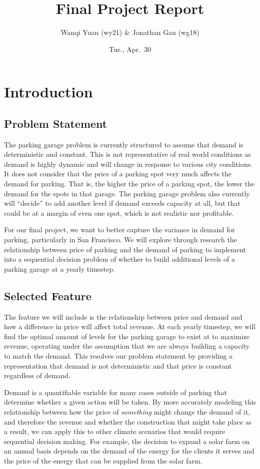 \documentclass[
  letterpaper,
  DIV=11,
  numbers=noendperiod]{scrartcl}
\title{Final Project Report}
\author{Wanqi Yuan (wy21) \& Jonathan Gan (wg18)}
\date{Tue., Apr.~30}
\begin{document}
\maketitle

\section{Introduction}\label{introduction}

\subsection{Problem Statement}\label{problem-statement}

The parking garage problem is currently structured to assume that demand
is deterministic and constant. This is not representative of real world
conditions as demand is highly dynamic and will change in response to
various city conditions. It does not consider that the price of a
parking spot very much affects the demand for parking. That is, the
higher the price of a parking spot, the lower the demand for the spots
in that garage. The parking garage problem also currently will
``decide'' to add another level if demand exceeds capacity at all, but
that could be at a margin of even one spot, which is not realistic nor
profitable.

For our final project, we want to better capture the variance in demand
for parking, particularly in San Francisco. We will explore through
research the relationship between price of parking and the demand of
parking to implement into a sequential decision problem of whether to
build additional levels of a parking garage at a yearly timestep.

\subsection{Selected Feature}\label{selected-feature}

The feature we will include is the relationship between price and demand
and how a difference in price will affect total revenue. At each yearly
timestep, we will find the optimal amount of levels for the parking
garage to exist at to maximize revenue, operating under the assumption
that we are always building a capacity to match the demand. This
resolves our problem statement by providing a representation that demand
is not deterministic and that price is constant regardless of demand.

Demand is a quantifiable variable for many cases outside of parking that
determine whether a given action will be taken. By more accurately
modeling this relationship between how the price of \emph{something}
might change the demand of it, and therefore the revenue and whether the
construction that might take place as a result, we can apply this to
other climate scenarios that would require sequential decision making.
For example, the decision to expand a solar farm on an annual basis
depends on the demand of the energy for the clients it serves and the
price of the energy that can be supplied from the solar farm.
\end{document}
